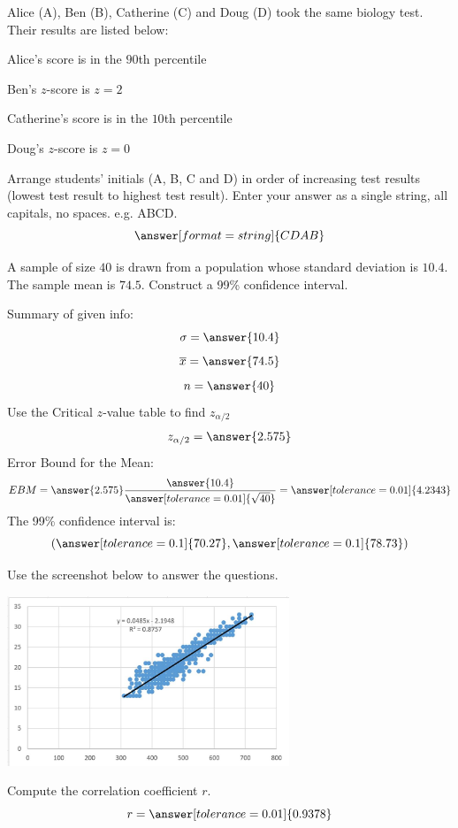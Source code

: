 \documentclass{ximera}
\begin{document}
\begin{problem}\label{prob:140finalprob3}
Alice (A), Ben (B), Catherine (C) and Doug (D) took the same biology test.  Their results are listed below: 

Alice's score is in the $90$th percentile 

Ben's $z$-score is $z = 2$ 

Catherine's score is in the $10$th percentile 

Doug's $z$-score is $z = 0$

Arrange students’ initials (A, B, C and D) in order of increasing test results (lowest test result to highest test result).  Enter your answer as a single string, all capitals, no spaces.  e.g. ABCD.
$$\answer[format=string]{CDAB}$$
\end{problem}

\begin{problem}\label{prob:140finalprob4}
A sample of size $40$ is drawn from a population whose standard deviation is $10.4$.  The sample mean is $74.5$.  Construct a 99\% confidence interval.

Summary of given info:
$$\sigma=\answer{10.4}$$
$$\overline{x}=\answer{74.5}$$
$$n=\answer{40}$$
Use the Critical $z$-value table to find $z_{\alpha/2}$
$$z_{\alpha/2}=\answer{2.575}$$
Error Bound for the Mean:
$$EBM=\answer{2.575}\frac{\answer{10.4}}{\answer[tolerance=0.01]{\sqrt{40}}}=\answer[tolerance=0.01]{4.2343}$$
The 99\% confidence interval is:
$$(\answer[tolerance=0.1]{70.27},\answer[tolerance=0.1]{78.73})$$
\end{problem}

\begin{problem}\label{prob:140finalprob5}
Use the screenshot below to answer the questions.  

\begin{center}
\includegraphics[height=2in]{140finalpic1.jpg}
\end{center}

Compute the correlation coefficient $r$.
 $$r=\answer[tolerance=0.01]{0.9378}$$
\end{problem}
\end{document}
